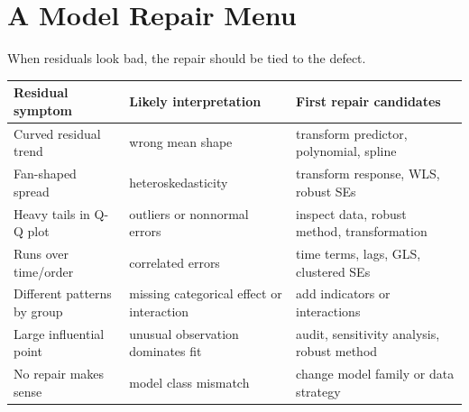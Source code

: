 \section{A Model Repair Menu}

When residuals look bad, the repair should be tied to the defect.

\begin{center}
\begin{tabular}{p{}p{}p{}}
\toprule
Residual symptom & Likely interpretation & First repair candidates \\
\midrule
Curved residual trend & wrong mean shape & transform predictor, polynomial, spline \\
Fan-shaped spread & heteroskedasticity & transform response, WLS, robust SEs \\
Heavy tails in Q-Q plot & outliers or nonnormal errors & inspect data, robust method, transformation \\
Runs over time/order & correlated errors & time terms, lags, GLS, clustered SEs \\
Different patterns by group & missing categorical effect or interaction & add indicators or interactions \\
Large influential point & unusual observation dominates fit & audit, sensitivity analysis, robust method \\
No repair makes sense & model class mismatch & change model family or data strategy \\
\bottomrule
\end{tabular}
\end{center}

